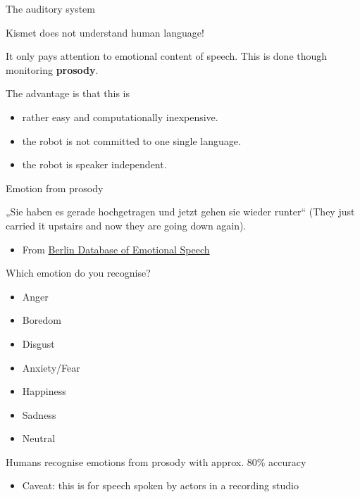\documentclass[compress]{beamer}
\providecommand{\tightlist}{%
  \setlength{\itemsep}{0pt}\setlength{\parskip}{0pt}}
\begin{document}
\begin{frame}{The auditory system}

Kismet does not understand human language!

It only pays attention to emotional content of speech. This is done
though monitoring \textbf{prosody}.

The advantage is that this is

\begin{itemize}
\tightlist
\item
  rather easy and computationally inexpensive.
\item
  the robot is not committed to one single language.
\item
  the robot is speaker independent.
\end{itemize}

\end{frame}

\begin{frame}{Emotion from prosody}

„Sie haben es gerade hochgetragen und jetzt gehen sie wieder runter``
(They just carried it upstairs and now they are going down again).

\begin{itemize}
\tightlist
\item
  From \href{http://www.expressive-speech.net/}{Berlin Database of
  Emotional Speech}
\end{itemize}

Which emotion do you recognise?

\begin{itemize}
\tightlist
\item
  Anger
\item
  Boredom
\item
  Disgust
\item
  Anxiety/Fear
\item
  Happiness
\item
  Sadness
\item
  Neutral
\end{itemize}

Humans recognise emotions from prosody with approx. 80\% accuracy

\begin{itemize}
\tightlist
\item
  Caveat: this is for speech spoken by actors in a recording studio
\end{itemize}

\end{frame}
\end{document}
